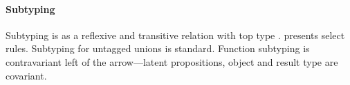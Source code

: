 {%
%
%
%
%


\paragraph{Subtyping}
Subtyping is as a reflexive and transitive relation with top type \Top. 
 presents select rules.
Subtyping for untagged unions is standard.
Function subtyping is contravariant left of the arrow---latent propositions, object
and result type are covariant.

}
